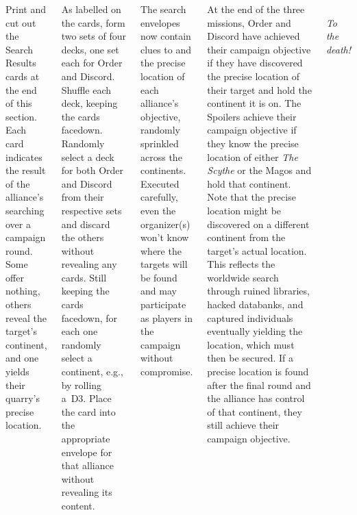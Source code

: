 \begin{columns}
Print and cut out the Search Results cards at the end of this section.
Each card indicates the result of the alliance's searching over a
campaign round.  Some offer nothing, others reveal the target's
continent, and one yields their quarry's precise location.

As labelled on the cards, form two sets of four decks, one set each
for Order and Discord.  Shuffle each deck, keeping the cards facedown.
Randomly select a deck for both Order and Discord from their
respective sets and discard the others without revealing any cards.
Still keeping the cards facedown, for each one randomly select a
continent, e.g., by rolling a~D3.  Place the card into the appropriate
envelope for that alliance without revealing its content.

The search envelopes now contain clues to and the precise location of
each alliance's objective, randomly sprinkled across the continents.
Executed carefully, even the organizer(s) won't know where the targets
will be found and may participate as players in the campaign without
compromise.


At the end of the three missions, Order and Discord have achieved
their campaign objective if they have discovered the precise location
of their target and hold the continent it is on.  The Spoilers achieve
their campaign objective if they know the precise location of either
\emph{The Scythe} or the Magos and hold that continent.  Note that the
precise location might be discovered on a different continent from the
target's actual location.  This reflects the worldwide search through
ruined libraries, hacked databanks, and captured individuals
eventually yielding the location, which must then be secured.  If a
precise location is found after the final round and the alliance has
control of that continent, they still achieve their campaign
objective.

\vfill
\noindent%
\begin{minipage}[t]{1.0\linewidth}\centering\small\it%
\\
To the death!
\end{minipage}


\end{columns}
